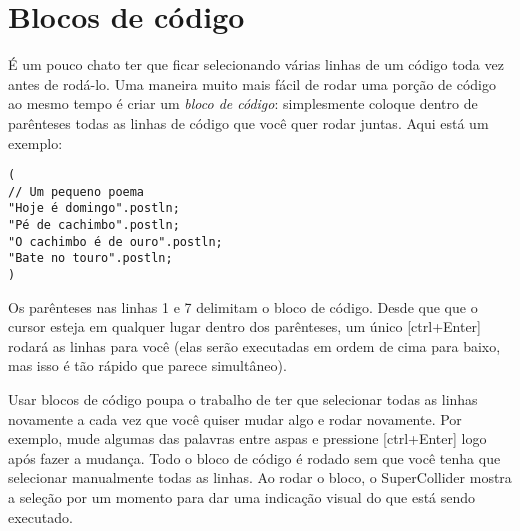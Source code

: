 \section{Blocos de código}
\label{sec:code-block}


É um pouco chato ter que ficar selecionando várias linhas de um código toda vez antes de rodá-lo. Uma maneira muito mais fácil de rodar uma porção de código ao mesmo tempo é criar um \textit{bloco de código}: simplesmente coloque dentro de parênteses todas as linhas de código que você quer rodar juntas. Aqui está um exemplo:


\begin{lstlisting}[style=SuperCollider-IDE, basicstyle=\scttfamily\footnotesize]
(
// Um pequeno poema
"Hoje é domingo".postln;
"Pé de cachimbo".postln;
"O cachimbo é de ouro".postln;
"Bate no touro".postln;
)
\end{lstlisting}

Os parênteses nas linhas 1 e 7 delimitam o bloco de código. Desde que que o cursor esteja em qualquer lugar dentro dos parênteses, um único [ctrl+Enter] rodará as linhas para você (elas serão executadas em ordem de cima para baixo, mas isso é tão rápido que parece simultâneo).

Usar blocos de código poupa o trabalho de ter que selecionar todas as linhas novamente a cada vez que você quiser mudar algo e rodar novamente. Por exemplo, mude algumas das palavras entre aspas e pressione [ctrl+Enter] logo após fazer a mudança. Todo o bloco de código é rodado sem que você tenha que selecionar manualmente todas as linhas. Ao rodar o bloco, o SuperCollider mostra a seleção por um momento para dar uma indicação visual do que está sendo executado.
